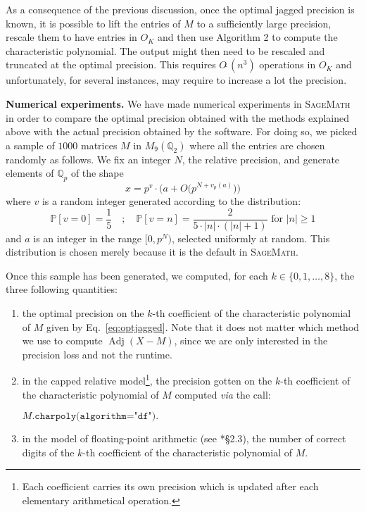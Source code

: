 \documentclass{sig-alternate-05-2015}
\DeclareMathOperator{\adj}{Adj}
\newcommand{\Q}{\mathbb Q}
\newcommand{\softO}{O\tilde{~}}
\begin{document}
\begin{rem} \label{rem:lift_for_optimal}
As a consequence of the previous discussion, once the optimal jagged 
precision is known, it is possible to lift the entries of $M$ to a sufficiently
large precision, rescale them to have entries in $O_K$
and then use Algorithm 2 to
compute the characteristic polynomial.
The output might then need to be rescaled and
 truncated at the optimal precision. 
This requires $\softO(n^3)$ operations in $O_K$ 
and unfortunately, for several instances, may require to increase a lot the precision.
\end{rem}

\medskip

\noindent
{\bf Numerical experiments.}
We have made numerical experiments in \textsc{SageMath}~\cite{sage}
in order to compare the optimal precision obtained with the methods
explained above with the actual precision obtained by the software.
For doing so, we picked a sample of $1000$ matrices $M$ in 
$M_9(\Q_2)$ where all the entries are chosen randomly as follows.
We fix an integer $N$, the relative precision, and generate elements of $\Q_p$ of the shape
\[
x = p^v \cdot \big(a + O\big(p^{N+v_p(a)}\big)\big)
\]
where $v$ is a random integer generated according to the distribution:
\[
\mathbb P [v = 0] = \frac 1 5 \quad ; \quad
\mathbb P [v = n] = \frac 2 {5\cdot |n| \cdot (|n|+1)} \text{ for }
|n| \geq 1
\]
and $a$ is an integer in the range $[0, p^N)$, selected uniformly at random.
This distribution is chosen merely because it is the default in \textsc{SageMath}.

Once this sample has been generated, we computed, for each $k \in \{0, 
1, \ldots, 8\}$, the three following quantities:

\vspace{-2mm}

\begin{enumerate}[$\bullet$]
\renewcommand{\itemsep}{0pt}
\item the optimal precision on the $k$-th coefficient of the 
characteristic polynomial of $M$ given by Eq.~\eqref{eq:optjagged}.
Note that it does not matter which method we use to compute $\adj(X-M)$,
since we are only interested in the precision loss and not the runtime.
\item in the capped relative model\footnote{Each 
coefficient carries its own precision which is updated after each 
elementary arithmetical operation.},
the precision gotten on the $k$-th coefficient of the 
characteristic polynomial of $M$ computed \emph{via} the call:

\hfill$M\texttt{.charpoly(algorithm="df")}.$\hfill\null

\item in the model of floating-point arithmetic (see 
\cite{caruso:17a}*{\S 2.3}), the number of correct digits of the 
$k$-th coefficient of the characteristic polynomial of $M$.
\end{enumerate}
\end{document}
